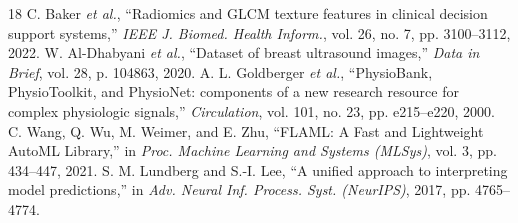 \documentclass[conference]{IEEEtran}
\begin{document}
\begin{thebibliography}{18}
 C. Baker \textit{et al.}, ``Radiomics and GLCM texture features in clinical decision support systems,'' \textit{IEEE J. Biomed. Health Inform.}, vol. 26, no. 7, pp. 3100--3112, 2022.
 W. Al-Dhabyani \textit{et al.}, ``Dataset of breast ultrasound images,'' \textit{Data in Brief}, vol. 28, p. 104863, 2020.
 A. L. Goldberger \textit{et al.}, ``PhysioBank, PhysioToolkit, and PhysioNet: components of a new research resource for complex physiologic signals,'' \textit{Circulation}, vol. 101, no. 23, pp. e215--e220, 2000.
 C. Wang, Q. Wu, M. Weimer, and E. Zhu, ``FLAML: A Fast and Lightweight AutoML Library,'' in \textit{Proc. Machine Learning and Systems (MLSys)}, vol. 3, pp. 434--447, 2021.
 S. M. Lundberg and S.-I. Lee, ``A unified approach to interpreting model predictions,'' in \textit{Adv. Neural Inf. Process. Syst. (NeurIPS)}, 2017, pp. 4765--4774.
\end{thebibliography}
\end{document}
